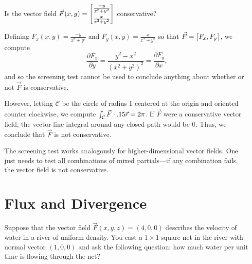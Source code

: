 \begin{example}
	Is the vector field
	$\vec F(x,y) = \mat{\frac{-y}{x^2+y^2}\\[4pt]\frac{x}{x^2+y^2}}$ conservative?

	Defining $F_x(x,y)=\frac{-y}{x^2+y^2}$ and $F_y(x,y)=\frac{x}{x^2+y^2}$
	so that $\vec F = \mat{F_x,F_y}$, we compute
	\[
		\frac{\partial F_x}{\partial y} = \frac{y^2-x^2}{(x^2+y^2)^2}
		= 
		\frac{\partial F_y}{\partial x},
	\]
	and so the screening test cannot be used to conclude anything
	about whether or not $\vec F$ is conservative.

	
	However, letting $\mathcal C$ be the circle of radius 1 centered at the
	origin and oriented counter clockwise, we compute $\int_{\mathcal C} \vec F\cdot .15 \vec r
	=2\pi$.  If $\vec F$ were a conservative vector field, the 
	vector line integral around any closed path would be $0$.  Thus, we conclude
	that $\vec F$ is not conservative.
	
\end{example}

The screening test works analogously for higher-dimensional vector fields.  One just
needs to test all combinations of mixed partials---if any combination fails, the vector
field is not conservative.

\begin{exercises}
\end{exercises}


\section{Flux and Divergence}

Suppose that the vector field $\vec F(x,y,z)=(4,0,0)$
describes the velocity of water in a river of uniform density.
You cast a $1\times 1$ square net in the river with normal
vector $(1,0,0)$ and ask the following question: how much 
water per unit time is flowing through the net?

\begin{center}
\end{center}

